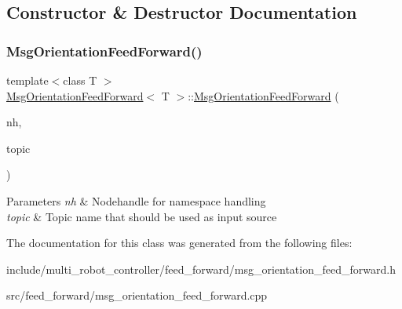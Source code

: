 \subsection{Constructor \& Destructor Documentation}
\mbox{\label{classMsgOrientationFeedForward_a487a69133c5098f14abeeeefe76306d1}} 
\subsubsection{\texorpdfstring{Msg\+Orientation\+Feed\+Forward()}{MsgOrientationFeedForward()}}
{\footnotesize\ttfamily template$<$class T $>$ \\
\hyperlink{classMsgOrientationFeedForward}{Msg\+Orientation\+Feed\+Forward}$<$ T $>$\+::\hyperlink{classMsgOrientationFeedForward}{Msg\+Orientation\+Feed\+Forward} (\begin{DoxyParamCaption}\item[{ros\+::\+Node\+Handle \&}]{nh,  }\item[{std\+::string}]{topic }\end{DoxyParamCaption})}


\begin{DoxyParams}{Parameters}
{\em nh} & Nodehandle for namespace handling \\
\hline
{\em topic} & Topic name that should be used as input source \\
\hline
\end{DoxyParams}


The documentation for this class was generated from the following files\+:\begin{DoxyCompactItemize}
\item 
include/multi\+\_\+robot\+\_\+controller/feed\+\_\+forward/msg\+\_\+orientation\+\_\+feed\+\_\+forward.\+h\item 
src/feed\+\_\+forward/msg\+\_\+orientation\+\_\+feed\+\_\+forward.\+cpp\end{DoxyCompactItemize}
